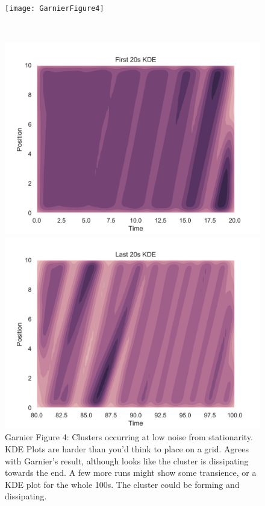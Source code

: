 \documentclass[11pt,a4paper, dvipsnames]{article}
\begin{document}
\begin{figure}
    \centering
    \begin{minipage}[b]{\textwidth}
        \centering
        
        \texttt{[image: GarnierFigure4]}
    \end{minipage} \\
    
    \begin{minipage}[b]{0.49\textwidth}
        \centering
        \includegraphics[width=\textwidth]{GarnierFigure4b}
    \end{minipage} %
    \begin{minipage}[b]{0.49\textwidth}
        \centering                    \includegraphics[width=\textwidth]{GarnierFigure4d}
    \end{minipage}
    \caption{Garnier Figure 4: Clusters occurring at low noise from stationarity. KDE Plots are harder than you'd think to place on a grid. Agrees with Garnier's result, although looks like the cluster is dissipating towards the end. A few more runs might show some transience, or a KDE plot for the whole 100s. The cluster could be forming and dissipating.}
\end{figure}
\end{document}
